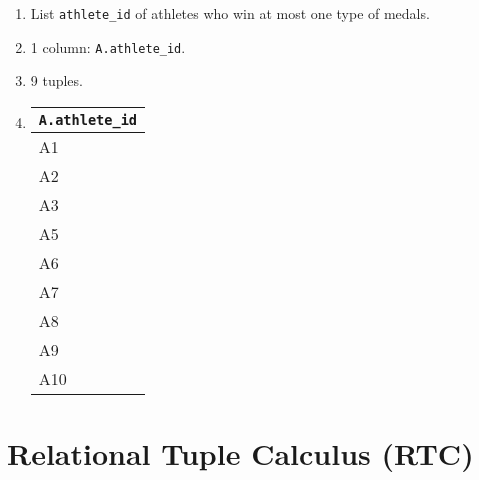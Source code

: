 \documentclass{homework}
\begin{document}
\begin{enumerate}
    \begin{enumerate}
        \item List \texttt{athlete\_id} of athletes who win at most one type of medals.
        \item 1 column: \texttt{A.athlete\_id}.
        \item 9 tuples.
        \item 
        \begin{tabular}{@{}l@{}}
            \toprule
            \texttt{A.athlete\_id} \\ \midrule
            A1          \\
            A2          \\
            A3          \\
            A5          \\
            A6          \\
            A7          \\
            A8          \\
            A9          \\
            A10         \\ \bottomrule
        \end{tabular}
    \end{enumerate}
\end{enumerate}

\section{Relational Tuple Calculus (RTC)}
\end{document}
